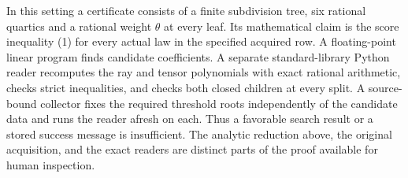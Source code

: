 \documentclass[11pt,a4paper]{article}
\begin{document}
In this setting a certificate consists of a finite subdivision tree,
six rational quartics and a rational weight $\theta$ at every leaf.
Its mathematical claim is the score inequality (1) for every actual
law in the specified acquired row. A floating-point linear program
finds candidate coefficients. A separate standard-library Python
reader recomputes the ray and tensor polynomials with exact rational
arithmetic, checks strict inequalities, and checks both closed
children at every split. A source-bound collector fixes the required
threshold roots independently of the candidate data and runs the
reader afresh on each. Thus a favorable search result or a stored
success message is insufficient. The analytic reduction above,
the original acquisition, and the exact readers are distinct parts
of the proof available for human inspection.
\end{document}
